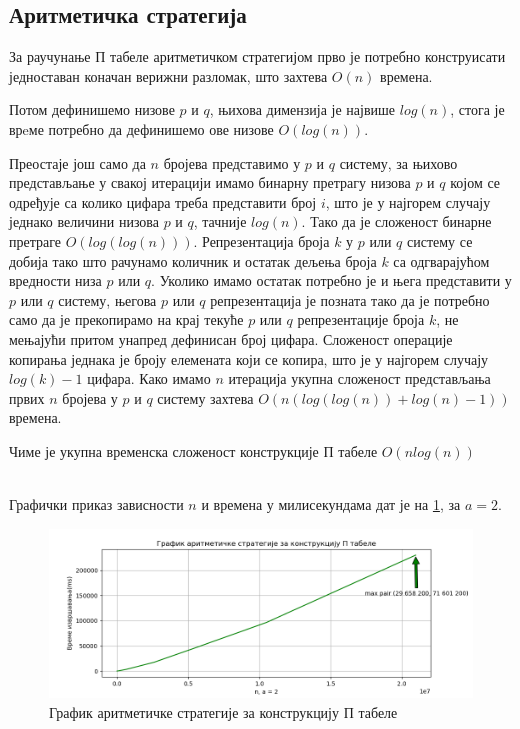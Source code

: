 \documentclass[a4paper]{article}
\begin{document}
\subsection{Аритметичка стратегија}

За раучунање П табеле аритметичком стратегијом прво је потребно конструисати једноставан коначан верижни разломак, што захтева $ O(n) $ времена. 

Потом дефинишемо низове $ p $ и $ q $, њихова димензија је највише $ log(n) $, стога је врeме потребно да дефинишемо ове низове $ O(log(n)) $.

Преостаје још само да $ n $ бројева представимо у $ p $ и $ q $ систему, за њихово представљање у свакој итерацији имамо бинарну претрагу низова $ p $ и $ q $ којом се одређује са колико цифара треба представити број $ i $, што је у најгорем случају једнако величини низова $ p $ и $ q $, тачније $ log(n) $. Тако да је сложеност бинарне претраге $ O(log(log(n))) $. Репрезентација броја $ k $ у $ p $ или $ q $ систему се добија тако што рачунамо количник и остатак дељења броја $ k $ са одгварајућом вредности низа $ p $ или $ q $. Уколико имамо остатак потребно је и њега представити у $ p $ или $ q $ систему, његова $ p $ или $ q $ репрезентација је позната тако да је потребно само да је прекопирамо на крај текуће $ p $ или $ q $ репрезентације броја $ k $, не мењајући притом унапред дефинисан број цифара. Сложеност операције копирања једнака је броју елемената који се копира, што је у најгорем случају $ log(k) - 1 $ цифара. Како имамо $ n $ итерација укупна сложеност представљања првих $ n $ бројева у $ p $ и $ q $ систему захтева $ O(n(log(log(n)) + log(n) - 1)) $ времена.

Чиме је укупна временска сложеност конструкције П табеле $ O(nlog(n)) $



\leavevmode\\
Графички приказ зависности $ n $ и времена у милисекундама дат је на \ref{fig:arithmetic}, за $ a = 2 $.

\begin{figure}[H]
	\caption{График аритметичке стратегије за конструкцију П табеле}
	\label{fig:arithmetic}
	\begin{center}
		\includegraphics[width=\textwidth]{arithmetic.png}
	\end{center}
\end{figure}
\end{document}

